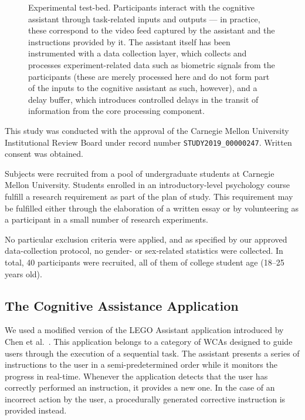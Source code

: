 \begin{figure}[h]
  \centering
  \caption{Experimental test-bed.
  Participants interact with the cognitive assistant through task-related inputs and outputs --- in practice, these correspond to the video feed captured by the assistant and the instructions provided by it.
  The assistant itself has been instrumented with a data collection layer, which collects and processes experiment-related data such as biometric signals from the participants (these are merely processed here and do not form part of the inputs to the cognitive assistant as such, however), and a delay buffer, which introduces controlled delays in the transit of information from the core processing component.}%
  \label{fig:experimentaltestbed}
\end{figure}

This study was conducted with the approval of the Carnegie Mellon University Institutional Review Board under record number \texttt{STUDY2019\_00000247}. 
Written consent was obtained.

Subjects were recruited from a pool of undergraduate students at Carnegie Mellon University.
Students enrolled in an introductory-level psychology course fulfill a research requirement as part of the plan of study.
This requirement may be fulfilled either through the elaboration of a written essay or by volunteering as a participant in a small number of research experiments.

No particular exclusion criteria were applied, and as specified by our approved data-collection protocol, no gender- or sex-related statistics were collected.
In total, 40 participants were recruited, all of them of college student age (\numrange{18}{25} years old).

\subsection{The Cognitive Assistance Application}

We used a modified version of the LEGO Assistant application introduced by Chen et al.~\cite{Chen:EarlyImplementation}.
This application belongs to a category of WCAs designed to guide users through the execution of a sequential task.
The assistant presents a series of instructions to the user in a semi-predetermined order while it monitors the progress in real-time.
Whenever the application detects that the user has correctly performed an instruction, it provides a new one.
In the case of an incorrect action by the user, a procedurally generated corrective instruction is provided instead.

